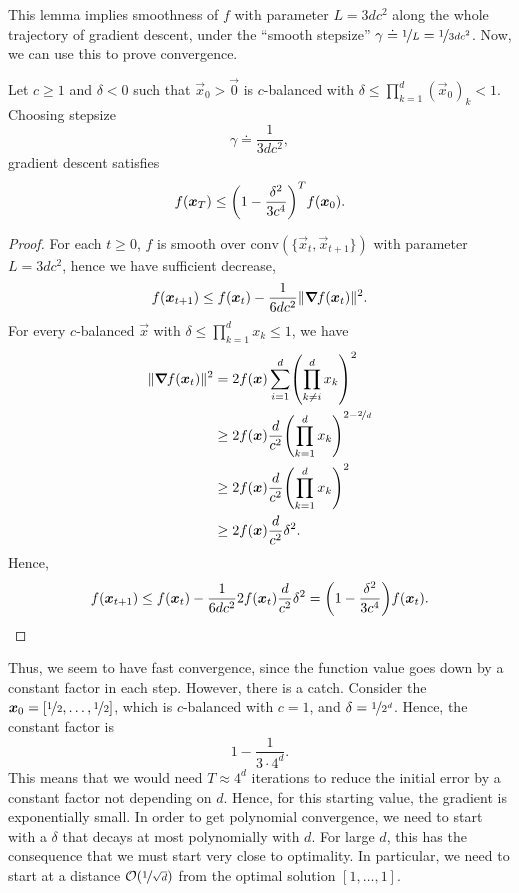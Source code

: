 This lemma implies smoothness of $f$ with parameter $L=3dc^2$ along the whole trajectory of
gradient descent, under the ``smooth stepsize'' $\gamma \doteq \nicefrac{1}{L} =
    \nicefrac{1}{3dc^2}$. Now, we can use this to prove convergence.

\begin{theorem}
    Let $c \geq 1$ and $\delta < 0$ such that $\vec{x}_0 > \vec{0}$ is $c$-balanced with
    $\delta \leq \prod_{k=1}^d (\vec{x}_0)_k < 1$. Choosing stepsize \[
        \gamma \doteq \frac{1}{3dc^2},
    \]
    gradient descent satisfies \[
        f(\vec{x}_T) \leq \lft( 1- \frac{\delta^2}{3c^4} \rgt)^T f(\vec{x}_0).
    \]
\end{theorem}

\begin{proof}
    For each $t \geq 0$, $f$ is smooth over $\mathrm{conv}(\{ \vec{x}_t, \vec{x}_{t+1} \})$ with
    parameter $L = 3dc^2$, hence we have sufficient decrease, \[
        f(\vec{x}_{t+1}) \leq f(\vec{x}_t) - \frac{1}{6dc^2} \| \grad{f(\vec{x}_t)}{} \|^2.
    \]
    For every $c$-balanced $\vec{x}$ with $\delta \leq \prod_{k=1}^d x_k \leq 1$, we have
    \begin{align*}
        \| \grad{f(\vec{x}_t)}{} \|^2 & = 2f(\vec{x}) \sum_{i=1}^{d} \lft( \prod_{k \neq i}^d x_k \rgt)^2                    \\
                                      & \geq 2 f(\vec{x}) \frac{d}{c^2} \lft( \prod_{k=1}^{d} x_k \rgt)^{2- \nicefrac{2}{d}} \\
                                      & \geq 2 f(\vec{x}) \frac{d}{c^2} \lft( \prod_{k=1}^{d} x_k \rgt)^2                    \\
                                      & \geq 2 f(\vec{x}) \frac{d}{c^2} \delta^2.
    \end{align*}
    Hence, \[
        f(\vec{x}_{t+1}) \leq f(\vec{x}_t) - \frac{1}{6dc^2} 2 f(\vec{x}_t) \frac{d}{c^2}\delta^2 = \lft( 1 - \frac{\delta^2}{3c^4} \rgt) f(\vec{x}_t).
    \]
\end{proof}

Thus, we seem to have fast convergence, since the function value goes down by a constant factor in
each step. However, there is a catch. Consider the $\vec{x}_0 = [\nicefrac{1}{2}, \ldots,
    \nicefrac{1}{2}]$, which is $c$-balanced with $c=1$, and $\delta = \nicefrac{1}{2^d}$. Hence, the
constant factor is \[
    1 - \frac{1}{3\cdot 4^d}.
\]
This means that we would need $T \approx 4^d$ iterations to reduce the initial error by a constant
factor not depending on $d$. Hence, for this starting value, the gradient is exponentially small.
In order to get polynomial convergence, we need to start with a $\delta$ that decays at most
polynomially with $d$. For large $d$, this has the consequence that we must start very close to
optimality. In particular, we need to start at a distance $\bigo{\nicefrac{1}{\sqrt{d}}}$ from the
optimal solution $[1, \ldots, 1]$.

